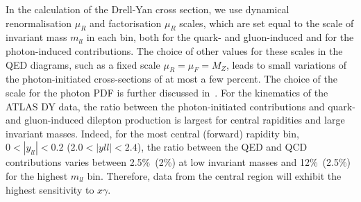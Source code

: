 In the  calculation of the Drell-Yan cross section, we use
dynamical renormalisation $\mu_{R}$ and factorisation $\mu_{R}$
scales, which are set equal to the scale of invariant mass $m_{ll}$ 
in each bin, both for the quark- and gluon-induced and for the photon-induced
contributions.
%
The choice of other values for these scales in the QED diagrams,
such as a fixed scale $\mu_R=\mu_F=M_Z$, leads
to  small variations of the photon-initiated cross-sections of at most a few percent.
%
The choice of the scale for the photon PDF  is further discussed
in~\cite{Dittmaier:2009cr}.
%
For the kinematics of the ATLAS DY data, the ratio between the photon-initiated
contributions and  quark- and gluon-induced dilepton production is largest
for central rapidities and large invariant masses. 
%
Indeed, for the most central (forward) rapidity
bin, $0 < |y_{ll}| < 0.2$ ($2.0 < |yll| < 2.4$), the ratio
between the QED and QCD contributions varies between 2.5\%~(2\%) at low
invariant masses and 12\%~(2.5\%) for the highest $m_{ll}$ bin.
%
Therefore, data from the central region will exhibit the highest
sensitivity to $x\gamma$.

